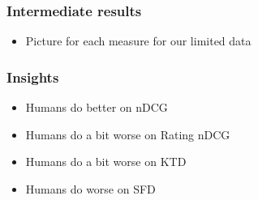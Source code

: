 \begin{frame}
\frametitle{Intermediate results}
\begin{itemize}
	\item Picture for each measure for our limited data
\end{itemize}
\end{frame}

\begin{frame}
\frametitle{Insights}
\begin{itemize}
	\item Humans do better on nDCG
	\item Humans do a bit worse on Rating nDCG
	\item Humans do a bit worse on KTD
	\item Humans do worse on SFD
\end{itemize}
\end{frame}